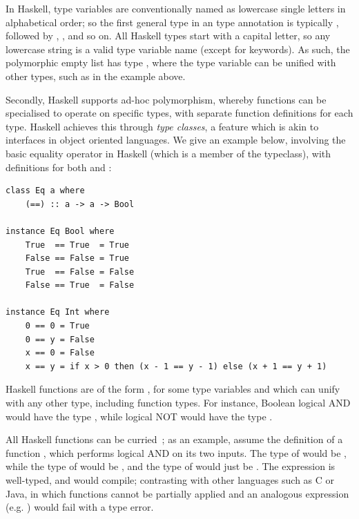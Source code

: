 In Haskell, type variables are conventionally named as lowercase single letters in alphabetical order; so the first general type in an type annotation is typically , followed by , , and so on. All Haskell types start with a capital letter, so any lowercase string is a valid type variable name (except for keywords). As such, the polymorphic empty list \inline{[]} has type \inline{[a]}, where the type variable  can be unified with other types, such as  in the example above.

Secondly, Haskell supports ad-hoc polymorphism, whereby functions can be specialised to operate on specific types, with separate function definitions for each type. Haskell achieves this through \emph{type classes}, a feature which is akin to interfaces in object oriented languages. We give an example below, involving the basic equality operator in Haskell (which is a member of the  typeclass), with definitions for both  and :

\begin{lstlisting}
class Eq a where
    (==) :: a -> a -> Bool

instance Eq Bool where
    True  == True  = True
    False == False = True
    True  == False = False
    False == True  = False

instance Eq Int where
    0 == 0 = True
    0 == y = False
    x == 0 = False
    x == y = if x > 0 then (x - 1 == y - 1) else (x + 1 == y + 1)
\end{lstlisting}

Haskell functions are of the form , for some type variables  and  which can unify with any other type, including function types. For instance, Boolean logical AND would have the type , while logical NOT would have the type .

All Haskell functions can be curried~\cite{currying}; as an example, assume the definition of a function , which performs logical AND on its two inputs. The type of  would be , while the type of  would be , and the type of  would just be . The expression  is well-typed, and would compile; contrasting with other languages such as C or Java, in which functions cannot be partially applied and an analogous expression (e.g. ) would fail with a type error.

